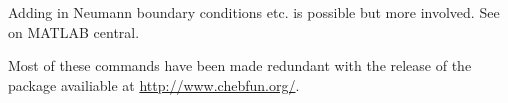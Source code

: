 \documentclass[12pt, a4paper]{article}
\theoremstyle{definition}
\newtheorem{example}[thm]{Example}
\newtheorem{exercise}[thm]{Exercise}
\theoremstyle{remark}
\numberwithin{equation}{section}
\begin{document}
Adding in Neumann boundary conditions etc. is possible but more involved. See  on MATLAB central.

Most of these commands have been made redundant with the release of the package  availiable at \url{http://www.chebfun.org/}. 

\newpage

%
%
%
%
%
%
\end{document}
